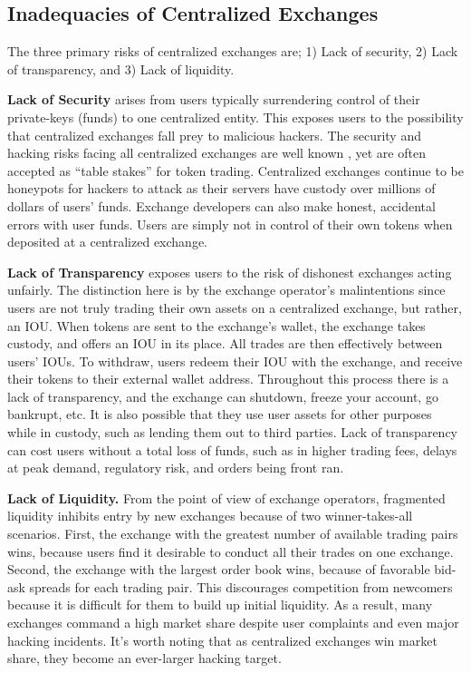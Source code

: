 \documentclass[UTF8,nofonts]{article}
\begin{document}
\begin{multicols}{2}
\subsection{Inadequacies of Centralized Exchanges}
The three primary risks of centralized exchanges are; 1) Lack of security, 2) Lack of transparency, and 3) Lack of liquidity.

\textbf{Lack of Security} arises from users typically surrendering control of their private-keys (funds) to one centralized entity. This exposes users to the possibility that centralized exchanges fall prey to malicious hackers. The security and hacking risks facing all centralized exchanges are well known \cite{coincheckhack}  \cite{mcmillan2014inside}, yet are often accepted as \enquote{table stakes} for token trading. Centralized exchanges continue to be honeypots for hackers to attack as their servers have custody over millions of dollars of users' funds. Exchange developers can also make honest, accidental errors with user funds. Users are simply not in control of their own tokens when deposited at a centralized exchange.

\textbf{Lack of Transparency} exposes users to the risk of dishonest exchanges acting unfairly. The distinction here is by the exchange operator's malintentions since users are not truly trading their own assets on a centralized exchange, but rather, an IOU. When tokens are sent to the exchange's wallet, the exchange takes custody, and offers an IOU in its place. All trades are then effectively between users' IOUs. To withdraw, users redeem their IOU with the exchange, and receive their tokens to their external wallet address. Throughout this process there is a lack of transparency, and the exchange can shutdown, freeze your account, go bankrupt, etc. It is also possible that they use user assets for other purposes while in custody, such as lending them out to third parties. Lack of transparency can cost users without a total loss of funds, such as in higher trading fees, delays at peak demand, regulatory risk, and orders being front ran.

\textbf{Lack of Liquidity.} From the point of view of exchange operators, fragmented liquidity inhibits entry by new exchanges because of two winner-takes-all scenarios. First, the exchange with the greatest number of available trading pairs wins, because users find it desirable to conduct all their trades on one exchange. Second, the exchange with the largest order book wins, because of favorable bid-ask spreads for each trading pair. This discourages competition from newcomers because it is difficult for them to build up initial liquidity. As a result, many exchanges command a high market share despite user complaints and even major hacking incidents. It's worth noting that as centralized exchanges win market share, they become an ever-larger hacking target. 


\end{multicols}
\end{document}
